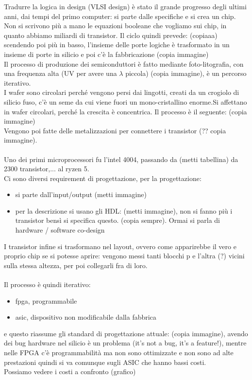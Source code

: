 \documentclass[oneside, 12pt]{extbook}
\begin{document}
Tradurre la logica in design (VLSI design) è stato il grande progresso degli ultimi anni, dai tempi del primo computer: si parte dalle specifiche e si crea un chip. Non si scrivono più a mano le equazioni booleane che vogliamo sui chip, in quanto abbiamo miliardi di transistor. Il ciclo quindi prevede: (copiaaa)\\scendendo poi più in basso, l'insieme delle porte logiche è trasformato in un insieme di porte in silicio e poi c'è la fabbricazione (copia immagine)\\Il processo di produzione dei semiconduttori è fatto mediante foto-litografia, con una frequenza alta (UV per avere una $\lambda$ piccola) (copia immagine), è un percorso iterativo.\\I wafer sono circolari perché vengono persi dai lingotti, creati da un crogiolo di silicio fuso, c'è un seme da cui viene fuori un mono-cristallino enorme.Si affettano in wafer circolari, perché la crescita è concentrica. Il processo è il seguente: (copia immagine)\\Vengono poi fatte delle metalizzazioni per connettere i transistor (?? copia immagine).\\\\Uno dei primi microprocessori fu l'intel 4004, passando da (metti tabellina) da 2300 transistor,... al ryzen 5.\\Ci sono diversi requirement di progettazione, per la progettazione:
\begin{itemize}
	\item si parte dall'input/output (metti immagine)
	\item per la descrizione si usano gli HDL: (metti immagine), non si fanno più i transistor bensì si specifica questo. (copia sempre). Ormai si parla di hardware / software co-design
\end{itemize}
I transistor infine si trasformano nel layout, ovvero come apparirebbe il vero e proprio chip se si potesse aprire: vengono messi tanti blocchi p e l'altra (?) vicini sulla stessa altezza, per poi collegarli fra di loro.\\\\Il processo è quindi iterativo:
\begin{itemize}
	\item fpga, programmabile
	\item asic, dispositivo non modificabile dalla fabbrica
\end{itemize}
e questo riassume gli standard di progettazione attuale: (copia immagine), avendo dei bug hardware nel silicio è un problema (it's not a bug, it's a feature!), mentre nelle FPGA c'è programmabilità ma non sono ottimizzate e non sono ad alte prestazioni quindi si va comunque sugli ASIC che hanno bassi costi.\\Possiamo vedere i costi a confronto (grafico)
\end{document}
